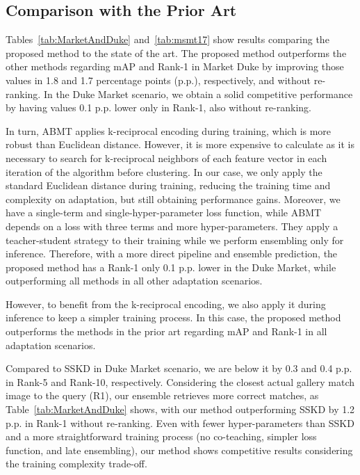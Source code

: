\documentclass[journal]{IEEEtran}
\begin{document}
\subsection{Comparison with the Prior Art}
Tables~\ref{tab:MarketAndDuke} and~\ref{tab:msmt17} show results comparing the proposed method to the state of the art. The proposed method outperforms the other methods regarding mAP and Rank-1 in Market  Duke by improving those values in 1.8 and 1.7 percentage points (p.p.), respectively, and without re-ranking. In the Duke  Market scenario, we obtain a solid competitive performance by having values 0.1 p.p. lower only in Rank-1, also without re-ranking. 
 
In turn, ABMT applies k-reciprocal encoding during training, which is more robust than Euclidean distance. 
However, it is more expensive to calculate as it is necessary to search for k-reciprocal neighbors of each feature vector in each iteration of the algorithm before clustering. In our case, we only apply the standard Euclidean distance during training, reducing the training time and complexity on adaptation, but still obtaining performance gains. Moreover, we have a single-term and single-hyper-parameter loss function, while ABMT depends on a loss with three terms and more hyper-parameters. They apply a teacher-student strategy to their training while we perform ensembling only for inference. Therefore, with a more direct pipeline and ensemble prediction, the proposed method has a Rank-1 only 0.1 p.p. lower in the Duke  Market, while outperforming all methods in all other adaptation scenarios. 



However, to benefit from the k-reciprocal encoding, we also apply it during inference to keep a simpler training process. In this case, the proposed method outperforms the methods in the prior art regarding mAP and Rank-1 in all adaptation scenarios.  \par 

Compared to SSKD in Duke  Market scenario, we are below it by 0.3 and 0.4 p.p. in Rank-5 and Rank-10, respectively. Considering the closest actual gallery match image to the query (R1), our ensemble retrieves more correct matches, as Table~\ref{tab:MarketAndDuke} shows, with our method outperforming SSKD by 1.2 p.p. in Rank-1 without re-ranking. Even with fewer hyper-parameters than SSKD and a more straightforward training process (no co-teaching, simpler loss function, and late ensembling), our method shows competitive results considering the training complexity trade-off.
\end{document}
